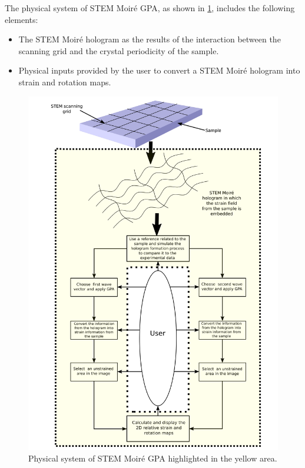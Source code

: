 \documentclass[12pt]{article}
\newcommand{\progname}{STEM Moir{\'e} GPA}
\begin{document}
The physical system of \progname{}, as shown in \cref{fig:system_description}, includes the following elements:
\begin{itemize}
\item The STEM Moir{\'e} hologram as the results of the interaction between the scanning grid and the crystal periodicity of the sample.
\item Physical inputs provided by the user to convert a STEM Moir{\'e} hologram into strain and rotation maps.
\end{itemize}

\begin{figure}[H]
\begin{center}
\includegraphics[scale=0.65]{Figures/System_description.png}
\caption{Physical system of \progname{} highlighted in the yellow area.}
\label{fig:system_description}
\end{center}
\end{figure}
\end{document}
